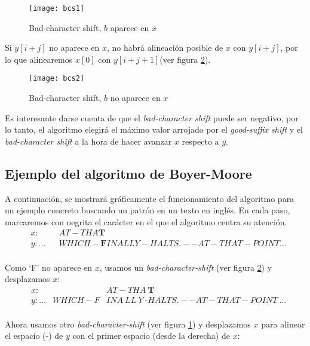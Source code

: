 \begin{figure}[H]
  \centering
    \texttt{[image: bcs1]}
  \caption{Bad-character shift, $b$ aparece en $x$}
	\label{bcs1}
\end{figure}

Si $y[i+j]$ no aparece en $x$, no habrá alineación posible de $x$ con $y[i+j]$, por lo que alinearemos $x[0]$ con $y[i+j+1]$(ver figura \ref{bcs2}).\\

\begin{figure}[H]
  \centering
    \texttt{[image: bcs2]}
  \caption{Bad-character shift, $b$ no aparece en $x$}
	\label{bcs2}
\end{figure}

Es interesante darse cuenta de que el \textit{bad-character shift} puede ser negativo, por lo tanto, el algoritmo elegirá el máximo valor arrojado por el \textit{good-suffix shift} y el \textit{bad-character shift} a la hora de hacer avanzar $x$ respecto a $y$.


\subsection{Ejemplo del algoritmo de Boyer-Moore}
A continuación, se mostrará gráficamente el funcionamiento del algoritmo para un ejemplo concreto buscando un patrón en un texto en inglés. En cada paso, marcaremos con negrita el carácter en el que el algoritmo centra su atención.\\

\begin{align*} 
&x:     & &AT-THA\textbf{T}\\
&y: ... & &WHICH-\textbf{F}INALLY-HALTS.--AT-THAT-POINT ...\\
\end{align*}

Como `F' no aparece en $x$, usamos un \textit{bad-character-shift} (ver figura \ref{bcs2}) y desplazamos $x$:\\

\begin{align*} 
&x:     &        &AT-THA\ \textbf{T}\\
&y: ... & WHICH-F&INA\ LL\ Y\ \textbf{-}HALTS.--AT-THAT-POINT \ ...\\
\end{align*}

Ahora usamos otro \textit{bad-character-shift} (ver figura \ref{bcs1}) y desplazamos $x$ para alinear el espacio (-) de $y$ con el primer espacio (desde la derecha) de $x$:\\

